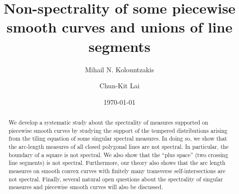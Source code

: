 \documentclass[12pt,a4paper,oneside]{amsart}
\theoremstyle{definition}
\begin{document}
\sloppy

\title[{Non-spectrality of some curves and lines segments }]{Non-spectrality of some piecewise smooth curves and unions of line segments }


\author{Mihail N. Kolountzakis}
\address{\href{http://math.uoc.gr/en/index.html}{Department of Mathematics and Applied Mathematics}, University of Crete,\\Voutes Campus, 70013 Heraklion, Greece,\newline and \newline \href{https://ics.forth.gr/}{Institute of Computer Science}, Foundation of Research and Technology Hellas, N. Plastira 100, Vassilika Vouton, 700 13, Heraklion, Greece}

\author{Chun-Kit Lai}
\address{\href{https://math.sfsu.edu/}{Department of Mathematics}, San Francisco State University, San Francisco,CA 94132.}

\makeatletter
{}
\makeatother
{}


\begin{abstract}
We develop a systematic study about the spectrality of measures supported on piecewise smooth curves by studying the support of the tempered distributions arising from the tiling equation of some singular spectral measures. In doing so, we show that the arc-length measures of all closed polygonal lines are not spectral. {In particular, the boundary of a square is not spectral. We also show that the ``plus space'' (two crossing line segments) is not spectral.} Furthermore, our theory also shows that the arc length measures on {smooth} convex curves with finitely many transverse self-intersections are not spectral. Finally, several natural open questions about the spectrality of singular measures and {piecewise} smooth curves will also be discussed. 
\end{abstract}

\date{\today}

\maketitle

\end{document}
